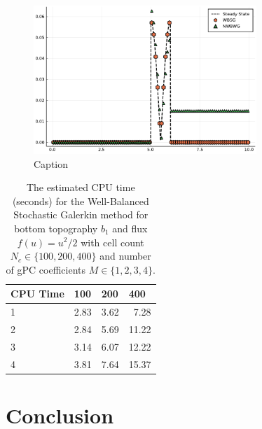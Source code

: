 \documentclass[12pt]{article}
\begin{document}
\begin{figure}[!htb]
    \centering
    \includegraphics[width=0.75\textwidth]{Figures/sd_dc_sgwb}
    \caption{Caption}
    \label{fig:b2-sd}
\end{figure}


\begin{table}[!htb]
\centering
\begin{tabular}{@{}l|lll@{}}
\toprule
CPU Time & 100  & 200  & 400   \\ \midrule
1        & 2.83 & 3.62 & \ 7.28  \\
2        & 2.84 & 5.69 & 11.22 \\
3        & 3.14 & 6.07 & 12.22 \\
4        & 3.81 & 7.64 & 15.37 \\ \bottomrule
\end{tabular}
\caption{The estimated CPU time (seconds) for the Well-Balanced Stochastic Galerkin method for bottom topography $b_1$ and flux $f(u) = u^2/2$ with cell count $N_c \in \{100, 200, 400\}$ and number of gPC coefficients $M \in \{1,2,3,4\}$.}
\label{tab:cpu-time}
\end{table}


\section{Conclusion}

\printbibliography
\end{document}

